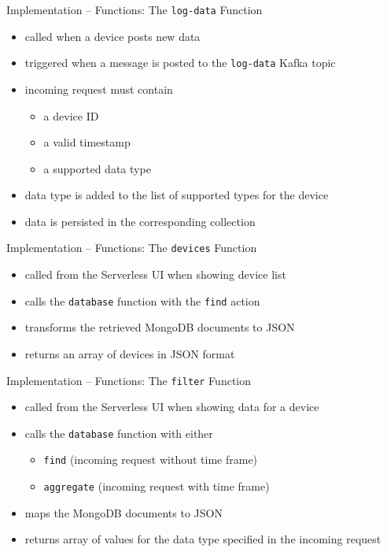 \begin{frame}{Implementation -- Functions: The \texttt{log-data} Function}
  \begin{itemize}
    \item called when a device posts new data
    \item triggered when a message is posted to the \texttt{log-data} Kafka topic
    \item incoming request must contain
      \begin{itemize}
        \item a device ID
        \item a valid timestamp
        \item a supported data type
      \end{itemize}
    \item data type is added to the list of supported types for the device
    \item data is persisted in the corresponding collection
  \end{itemize}
\end{frame}

\begin{frame}{Implementation -- Functions: The \texttt{devices} Function}
  \begin{itemize}
    \item called from the Serverless UI when showing device list
    \item calls the \texttt{database} function with the \texttt{find} action
    \item transforms the retrieved MongoDB documents to JSON
    \item returns an array of devices in JSON format
  \end{itemize}
\end{frame}

\begin{frame}{Implementation -- Functions: The \texttt{filter} Function}
  \begin{itemize}
    \item called from the Serverless UI when showing data for a device
    \item calls the \texttt{database} function with either
      \begin{itemize}
        \item \texttt{find} (incoming request without time frame)
        \item \texttt{aggregate} (incoming request with time frame)
      \end{itemize}
    \item maps the MongoDB documents to JSON
    \item returns array of values for the data type specified in the incoming request
  \end{itemize}
\end{frame}

